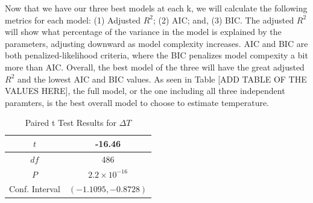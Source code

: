 Now that we have our three best models at each k, we will calculate the following metrics for each model: (1) Adjusted $R^{2}$; (2) AIC; and, (3) BIC. The adjusted $R^{2}$ will show what percentage of the variance in the model is explained by the parameters, adjusting downward as model complexity increases. AIC and BIC are both penalized-likelihood criteria, where the BIC penalizes model compexity a bit more than AIC. Overall, the best model of the three will have the great adjusted $R^{2}$ and the lowest AIC and BIC values. As seen in Table [ADD TABLE OF THE VALUES HERE], the full model, or the one including all three independent paramters, is the best overall model to choose to estimate temperature.

\begin{table}[ht]
 \begin{centering}
 \caption{Temperature Difference Statistics}
 \label{tab:lin_regression1}
 \end{centering}
\end{table}

\begin{table}[ht]
 \begin{centering}
 \begin{tabular}{|c|c|} 
 \hline
  $t$ & -16.46 \\ 
 \hline
 $df$ & 486 \\
  \hline
 $P$ & $2.2 \times 10^{-16}$ \\ 
  \hline
 Conf. Interval & $(-1.1095, -0.8728)$ \\ 
 \hline
 \end{tabular}
 \caption{Paired t Test Results for $\Delta T$}
 \label{tab:lin_regression2}
 \end{centering}
\end{table}